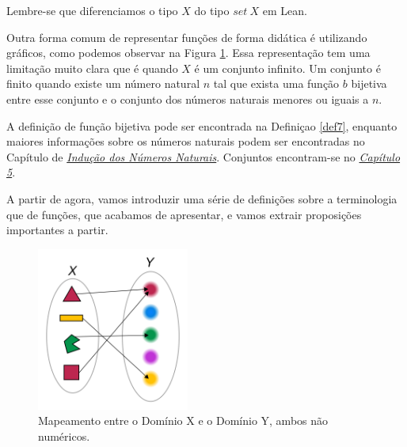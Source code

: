 Lembre-se que diferenciamos o tipo $X$ do tipo $set~X$ em Lean.

Outra forma comum de representar funções de forma didática é utilizando
gráficos, como podemos observar na Figura \ref{fig:functions-01-00}. Essa
representação tem uma limitação muito clara que é quando $X$ é um conjunto
infinito. Um conjunto é finito quando existe um número natural $n$ tal que
exista uma função $b$ bijetiva entre esse conjunto e o conjunto dos números
naturais menores ou iguais a $n$. 

A definição de função bijetiva pode ser encontrada na Definiçao \ref{def7},
enquanto maiores informações sobre os números naturais podem ser encontradas
no Capítulo de \textit{\hyperlink{chapter.8}{Indução dos Números Naturais}}.
Conjuntos encontram-se no \textit{\hyperlink{chapter.5}{Capítulo 5}}.

A partir de agora, vamos introduzir uma série de definições sobre a
terminologia que de funções, que acabamos de apresentar, e vamos extrair
proposições importantes a partir. 

\begin{figure}
    \centering      
    \includegraphics[width = 5cm]{figures/functions/fig-functions-01-00.png}
    \caption{Mapeamento entre o Domínio X e o Domínio Y, ambos não numéricos.}
    \label{fig:functions-01-00}
\end{figure}